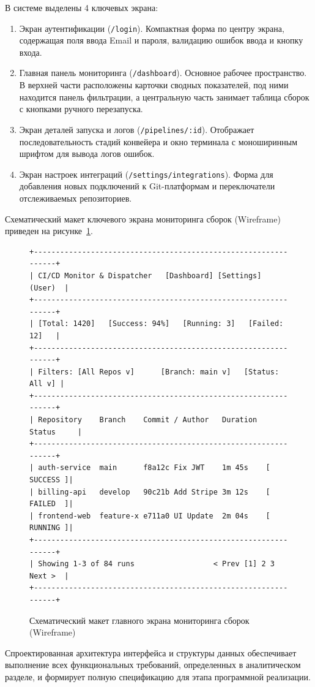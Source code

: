 В системе выделены 4 ключевых экрана:
\begin{enumerate}
    \item Экран аутентификации (\texttt{/login}). Компактная форма по центру экрана, содержащая поля ввода Email и пароля, валидацию ошибок ввода и кнопку входа.
    \item Главная панель мониторинга (\texttt{/dashboard}). Основное рабочее пространство. В верхней части расположены карточки сводных показателей, под ними находится панель фильтрации, а центральную часть занимает таблица сборок с кнопками ручного перезапуска.
    \item Экран деталей запуска и логов (\texttt{/pipelines/:id}). Отображает последовательность стадий конвейера и окно терминала с моноширинным шрифтом для вывода логов ошибок.
    \item Экран настроек интеграций (\texttt{/settings/integrations}). Форма для добавления новых подключений к Git-платформам и переключатели отслеживаемых репозиториев.
\end{enumerate}

Схематический макет ключевого экрана мониторинга сборок (Wireframe) приведен на рисунке~\ref{fig:wireframe_dashboard}.

\begin{figure}[H]
    \centering
    \footnotesize
    \begin{verbatim}
+----------------------------------------------------------------+
| CI/CD Monitor & Dispatcher   [Dashboard] [Settings]    (User)  |
+----------------------------------------------------------------+
| [Total: 1420]   [Success: 94%]   [Running: 3]   [Failed: 12]   |
+----------------------------------------------------------------+
| Filters: [All Repos v]      [Branch: main v]   [Status: All v] |
+----------------------------------------------------------------+
| Repository    Branch    Commit / Author   Duration  Status     |
+----------------------------------------------------------------+
| auth-service  main      f8a12c Fix JWT    1m 45s    [ SUCCESS ]|
| billing-api   develop   90c21b Add Stripe 3m 12s    [ FAILED  ]|
| frontend-web  feature-x e711a0 UI Update  2m 04s    [ RUNNING ]|
+----------------------------------------------------------------+
| Showing 1-3 of 84 runs                  < Prev [1] 2 3 Next >  |
+----------------------------------------------------------------+
    \end{verbatim}
    \caption{Схематический макет главного экрана мониторинга сборок (Wireframe)}
    \label{fig:wireframe_dashboard}
\end{figure}

Спроектированная архитектура интерфейса и структуры данных обеспечивает выполнение всех функциональных требований, определенных в аналитическом разделе, и формирует полную спецификацию для этапа программной реализации.
